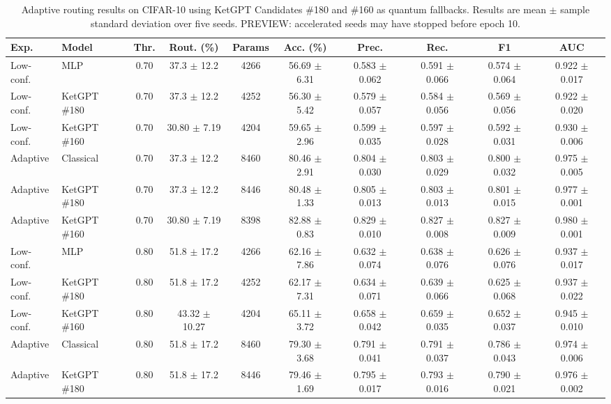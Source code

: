 \begin{table}[t]
\centering
\small
\caption{Adaptive routing results on CIFAR-10 using KetGPT Candidates \#180 and \#160 as quantum fallbacks. Results are mean $\pm$ sample standard deviation over five seeds. PREVIEW: accelerated seeds may have stopped before epoch 10.}
\label{tab:cifar10_adaptive}
\begin{tabular}{llcccccccc}
\toprule
Exp. & Model & Thr. & Rout. (\%) & Params & Acc. (\%) & Prec. & Rec. & F1 & AUC \\
\midrule
Low-conf. & MLP & 0.70 & 37.3 $\pm$ 12.2 & 4266 & 56.69 $\pm$ 6.31 & 0.583 $\pm$ 0.062 & 0.591 $\pm$ 0.066 & 0.574 $\pm$ 0.064 & 0.922 $\pm$ 0.017 \\
Low-conf. & KetGPT \#180 & 0.70 & 37.3 $\pm$ 12.2 & 4252 & 56.30 $\pm$ 5.42 & 0.579 $\pm$ 0.057 & 0.584 $\pm$ 0.056 & 0.569 $\pm$ 0.056 & 0.922 $\pm$ 0.020 \\
Low-conf. & KetGPT \#160 & 0.70 & 30.80 $\pm$ 7.19 & 4204 & 59.65 $\pm$ 2.96 & 0.599 $\pm$ 0.035 & 0.597 $\pm$ 0.028 & 0.592 $\pm$ 0.031 & 0.930 $\pm$ 0.006 \\
Adaptive & Classical & 0.70 & 37.3 $\pm$ 12.2 & 8460 & 80.46 $\pm$ 2.91 & 0.804 $\pm$ 0.030 & 0.803 $\pm$ 0.029 & 0.800 $\pm$ 0.032 & 0.975 $\pm$ 0.005 \\
Adaptive & KetGPT \#180 & 0.70 & 37.3 $\pm$ 12.2 & 8446 & 80.48 $\pm$ 1.33 & 0.805 $\pm$ 0.013 & 0.803 $\pm$ 0.013 & 0.801 $\pm$ 0.015 & 0.977 $\pm$ 0.001 \\
Adaptive & KetGPT \#160 & 0.70 & 30.80 $\pm$ 7.19 & 8398 & 82.88 $\pm$ 0.83 & 0.829 $\pm$ 0.010 & 0.827 $\pm$ 0.008 & 0.827 $\pm$ 0.009 & 0.980 $\pm$ 0.001 \\
Low-conf. & MLP & 0.80 & 51.8 $\pm$ 17.2 & 4266 & 62.16 $\pm$ 7.86 & 0.632 $\pm$ 0.074 & 0.638 $\pm$ 0.076 & 0.626 $\pm$ 0.076 & 0.937 $\pm$ 0.017 \\
Low-conf. & KetGPT \#180 & 0.80 & 51.8 $\pm$ 17.2 & 4252 & 62.17 $\pm$ 7.31 & 0.634 $\pm$ 0.071 & 0.639 $\pm$ 0.066 & 0.625 $\pm$ 0.068 & 0.937 $\pm$ 0.022 \\
Low-conf. & KetGPT \#160 & 0.80 & 43.32 $\pm$ 10.27 & 4204 & 65.11 $\pm$ 3.72 & 0.658 $\pm$ 0.042 & 0.659 $\pm$ 0.035 & 0.652 $\pm$ 0.037 & 0.945 $\pm$ 0.010 \\
Adaptive & Classical & 0.80 & 51.8 $\pm$ 17.2 & 8460 & 79.30 $\pm$ 3.68 & 0.791 $\pm$ 0.041 & 0.791 $\pm$ 0.037 & 0.786 $\pm$ 0.043 & 0.974 $\pm$ 0.006 \\
Adaptive & KetGPT \#180 & 0.80 & 51.8 $\pm$ 17.2 & 8446 & 79.46 $\pm$ 1.69 & 0.795 $\pm$ 0.017 & 0.793 $\pm$ 0.016 & 0.790 $\pm$ 0.021 & 0.976 $\pm$ 0.002 \\

\end{tabular}
\end{table}
